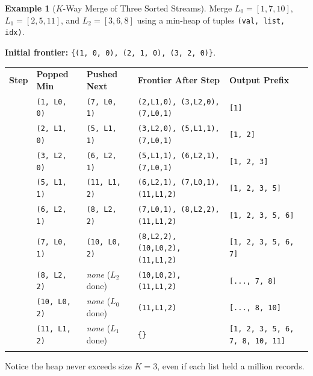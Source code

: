 \documentclass[11pt,a4paper]{article}
\theoremstyle{definition}
\newtheorem{example}{Example}[section]
\begin{document}
\begin{example}[$K$-Way Merge of Three Sorted Streams]
Merge $L_0 = [1, 7, 10]$, $L_1 = [2, 5, 11]$, and $L_2 = [3, 6, 8]$ using a min-heap of tuples \texttt{(val, list, idx)}.

\textbf{Initial frontier:} \texttt{\{(1, 0, 0), (2, 1, 0), (3, 2, 0)\}}.

\begingroup\footnotesize{}
\begin{tabularx}{\textwidth}{>{\centering\arraybackslash}p{0.8cm} >{\raggedright\arraybackslash}p{2.1cm} >{\raggedright\arraybackslash}p{2.25cm} >{\raggedright\arraybackslash}X >{\raggedright\arraybackslash}p{3.25cm}}
\arrayrulecolor{primaryblue}\toprule[1.1pt]
\rowcolor{primaryblue!10}
\textcolor{primaryblue}{\textbf{Step}} & \textcolor{primaryblue}{\textbf{Popped Min}} & \textcolor{primaryblue}{\textbf{Pushed Next}} & \textcolor{primaryblue}{\textbf{Frontier After Step}} & \textcolor{primaryblue}{\textbf{Output Prefix}} \\
\arrayrulecolor{codeframe}\midrule[0.6pt]
1 & \texttt{(1, L0, 0)} & \texttt{(7, L0, 1)} & \texttt{(2,L1,0), (3,L2,0), (7,L0,1)} & \texttt{[1]} \\
2 & \texttt{(2, L1, 0)} & \texttt{(5, L1, 1)} & \texttt{(3,L2,0), (5,L1,1), (7,L0,1)} & \texttt{[1, 2]} \\
3 & \texttt{(3, L2, 0)} & \texttt{(6, L2, 1)} & \texttt{(5,L1,1), (6,L2,1), (7,L0,1)} & \texttt{[1, 2, 3]} \\
4 & \texttt{(5, L1, 1)} & \texttt{(11, L1, 2)} & \texttt{(6,L2,1), (7,L0,1), (11,L1,2)} & \texttt{[1, 2, 3, 5]} \\
5 & \texttt{(6, L2, 1)} & \texttt{(8, L2, 2)} & \texttt{(7,L0,1), (8,L2,2), (11,L1,2)} & \texttt{[1, 2, 3, 5, 6]} \\
6 & \texttt{(7, L0, 1)} & \texttt{(10, L0, 2)} & \texttt{(8,L2,2), (10,L0,2), (11,L1,2)} & \texttt{[1, 2, 3, 5, 6, 7]} \\
7 & \texttt{(8, L2, 2)} & \emph{none} ($L_2$ done) & \texttt{(10,L0,2), (11,L1,2)} & \texttt{[..., 7, 8]} \\
8 & \texttt{(10, L0, 2)} & \emph{none} ($L_0$ done) & \texttt{(11,L1,2)} & \texttt{[..., 8, 10]} \\
9 & \texttt{(11, L1, 2)} & \emph{none} ($L_1$ done) & \texttt{\{\}} & \texttt{[1, 2, 3, 5, 6, 7, 8, 10, 11]} \\
\arrayrulecolor{primaryblue}\bottomrule[1.1pt]
\end{tabularx}\endgroup

\par\noindent Notice the heap never exceeds size $K = 3$, even if each list held a million records.
\end{example}
\end{document}
